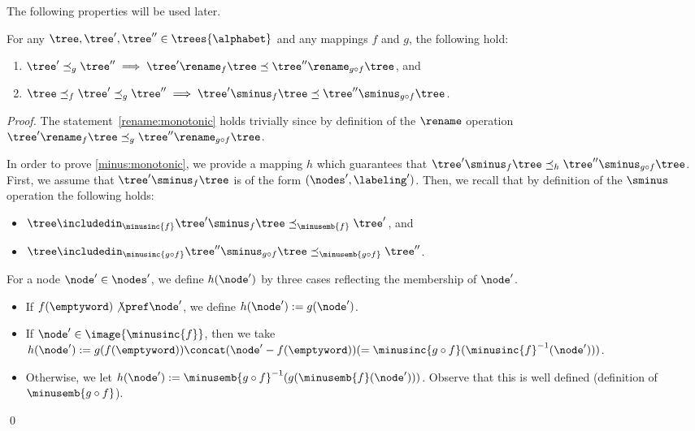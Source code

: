 The following properties will be used later.
%
\begin{lemma}
\label{lem:auxiliary}
For any $\tree,\tree',\tree''\in\trees{\alphabet}$ and any mappings $f$ and $g$, 
the following hold:
%
\begin{enumerate}
\item \label{rename:monotonic} $\tree'\preceq_g\tree''\implies\tree'\rename_f\tree\preceq
\tree''\rename_{g\circ f}\tree$, and
%
\item \label{minus:monotonic} $\tree\preceq_f\tree'\preceq_g\tree''\implies\tree'\sminus_f
\tree\preceq\tree''\sminus_{g\circ f}\tree$.
\end{enumerate}
%
\end{lemma}
%
\begin{proof}
The statement~\eqref{rename:monotonic} holds trivially since by definition of the $\rename$ 
operation $\tree'\rename_f\tree\preceq_g\tree''\rename_{g\circ f}\tree$.
%

In order to prove \eqref{minus:monotonic}, we provide a mapping $h$ which guarantees that 
$\tree'\sminus_f\tree\preceq_h\tree''\sminus_{g\circ f}\tree$.
%
First, we assume that $\tree'\sminus_f\tree$ is of the form $(\nodes',\labeling')$.
%
Then, we recall that by definition of the $\sminus$ operation the following holds:
%
\begin{itemize}
\item $\tree\includedin_{\minusinc{f}}\tree'\sminus_f\tree\preceq_{\minusemb{f}}\tree'$, and
%
\item  $\tree\includedin_{\minusinc{g\circ f}}\tree''\sminus_{g\circ f}\tree\preceq_{
\minusemb{g\circ f}}\tree''$.
\end{itemize}
%
For a node $\node'\in\nodes'$, we define $h(\node')$ by three cases reflecting the membership 
of $\node'$.
%
\begin{itemize}
\item If $f(\emptyword)\not\pref\node'$, we define $h(\node'):=g(\node')$.
%
\item If $\node'\in\image{\minusinc{f}}$, then we take $h(\node'):=g(f(\emptyword))\concat(
\node'-f(\emptyword))(=\minusinc{g\circ f}(\minusinc{f}^{-1}(\node')))$.
%
\item Otherwise, we let $h(\node'):=\minusemb{g\circ f}^{-1}(g(\minusemb{f}(\node')))$.
%
Observe that this is well defined (definition of $\minusemb{g\circ f}$).
%

\end{itemize}
%
\qed
\end{proof}

